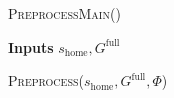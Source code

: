 \documentclass[letterpaper]{article} %
\begin{document}

\begin{algorithm}
\caption{\textsc{PreprocessMain()}}
\hspace*{\algorithmicindent} \textbf{Inputs} $s_{\textrm{home}}, G^{\textrm{full}}$ \\
\begin{algorithmic}[1]
\State \textsc{Preprocess}($s_{\textrm{home}},G^{\textrm{full}},\Phi$)
\end{algorithmic}
\end{algorithm}
\end{document}
